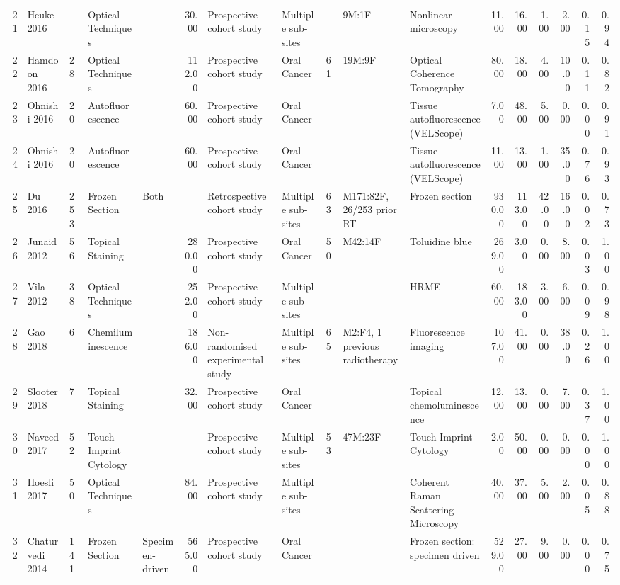 \begin{table}[ht]
\begin{tabular}{rllllrlllllrrrrrr}
  21 & Heuke 2016 &  & Optical Techniques &  & 30.00 & Prospective cohort study & Multiple sub-sites &  & 9M:1F & Nonlinear microscopy & 11.00 & 16.00 & 1.00 & 2.00 & 0.15 & 0.94 \\ 
  22 & Hamdoon 2016 & 28 & Optical Techniques &  & 112.00 & Prospective cohort study & Oral Cancer & 61 & 19M:9F & Optical Coherence Tomography & 80.00 & 18.00 & 4.00 & 10.00 & 0.11 & 0.82 \\ 
  23 & Ohnishi 2016 & 20 & Autofluorescence &  & 60.00 & Prospective cohort study & Oral Cancer &  &  & Tissue autofluorescence (VELScope) & 7.00 & 48.00 & 5.00 & 0.00 & 0.00 & 0.91 \\ 
  24 & Ohnishi 2016 & 20 & Autofluorescence &  & 60.00 & Prospective cohort study & Oral Cancer &  &  & Tissue autofluorescence (VELScope) & 11.00 & 13.00 & 1.00 & 35.00 & 0.76 & 0.93 \\ 
  25 & Du 2016 & 253 & Frozen Section & Both &  & Retrospective cohort study & Multiple sub-sites & 63 & M171:82F, 26/253 prior RT & Frozen section & 930.00 & 113.00 & 42.00 & 16.00 & 0.02 & 0.73 \\ 
  26 & Junaid 2012 & 56 & Topical Staining &  & 280.00 & Prospective cohort study & Oral Cancer & 50 & M42:14F & Toluidine blue & 269.00 & 3.00 & 0.00 & 8.00 & 0.03 & 1.00 \\ 
  27 & Vila 2012 & 38 & Optical Techniques &  & 252.00 & Prospective cohort study & Multiple sub-sites &  &  & HRME & 60.00 & 183.00 & 3.00 & 6.00 & 0.09 & 0.98 \\ 
  28 & Gao 2018 & 6 & Chemiluminescence &  & 186.00 & Non-randomised experimental study & Multiple sub-sites & 65 & M2:F4, 1 previous radiotherapy & Fluorescence imaging & 107.00 & 41.00 & 0.00 & 38.00 & 0.26 & 1.00 \\ 
  29 & Slooter 2018 & 7 & Topical Staining &  & 32.00 & Prospective cohort study & Oral Cancer &  &  & Topical chemoluminescence & 12.00 & 13.00 & 0.00 & 7.00 & 0.37 & 1.00 \\ 
  30 & Naveed 2017 & 52 & Touch Imprint Cytology &  &  & Prospective cohort study & Multiple sub-sites & 53 & 47M:23F & Touch Imprint Cytology & 2.00 & 50.00 & 0.00 & 0.00 & 0.00 & 1.00 \\ 
  31 & Hoesli 2017 & 50 & Optical Techniques &  & 84.00 & Prospective cohort study & Multiple sub-sites &  &  & Coherent Raman Scattering Microscopy & 40.00 & 37.00 & 5.00 & 2.00 & 0.05 & 0.88 \\ 
  32 & Chaturvedi 2014 & 141 & Frozen Section & Specimen-driven & 565.00 & Prospective cohort study & Oral Cancer &  &  & Frozen section: specimen driven & 529.00 & 27.00 & 9.00 & 0.00 & 0.00 & 0.75 \\ 

\end{tabular}
\end{table}

